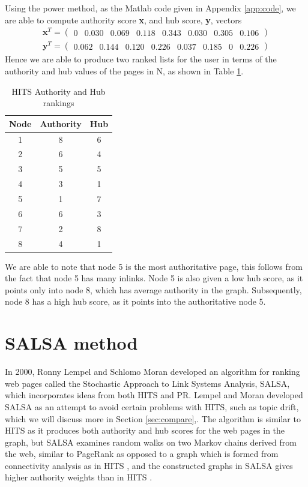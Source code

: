 \documentclass[11pt]{report}
\begin{document}
Using the power method, as the Matlab code given in Appendix \ref{app:code}, we are able to compute authority score \textbf{x}, and hub score, \textbf{y}, vectors
\begin{eqnarray}
\textbf{x}^T = \left( \begin{array} {cccccccc}
0 & 0.030 & 0.069 & 0.118 & 0.343 &0.030 &0.305 &0.106
\end{array}\right) \\
\textbf{y}^T = \left( \begin{array} {cccccccc}
0.062 & 0.144 & 0.120 & 0.226 & 0.037 & 0.185 & 0 & 0.226
\end{array}\right)
\end{eqnarray} Hence we are able to produce two ranked lists for the user in terms of the authority and hub values of the pages in N, as shown in Table \ref{Table:HITS}.

\begin{table}[h] \caption{HITS Authority and Hub rankings}
 \centering
 \begin{tabular} {c| c c} 
 Node & Authority & Hub \\ [0.5ex] 
 \hline
 1&8&6\\
 2&6&4\\
 3&5&5\\
 4&3&1\\
 5&1&7\\
 6&6&3\\
 7&2&8\\
 8&4&1\\
 \end{tabular}
 \label{Table:HITS}
\end{table} 

We are able to note that node 5 is the most authoritative page, this follows from the fact that node 5 has many inlinks. Node 5 is also given a low hub score, as it points only into node 8, which has average authority in the graph. Subsequently, node 8 has a high hub score, as it points into the authoritative node 5.

\section{SALSA method} \label{sec:SALSA}
In 2000, Ronny Lempel and Schlomo Moran developed an algorithm for ranking web pages called the Stochastic Approach to Link Systems Analysis, SALSA, which incorporates ideas from both HITS and PR. Lempel and Moran developed SALSA as an attempt to avoid certain problems with HITS, such as topic drift, which we will discuss more in Section \ref{sec:compare},\cite{bonato}. The algorithm is similar to HITS as it produces both authority and hub scores for the web pages in the graph, but SALSA examines random walks on two Markov chains derived from the web, similar to PageRank as opposed to a graph which is formed from connectivity analysis as in HITS \cite{lempel2000stochastic}, and the constructed graphs in SALSA gives higher authority weights than in HITS \cite{bonato}. 
\end{document}
